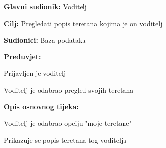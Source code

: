 					\noindent {}
					\begin{packed_item}
	
						\item \textbf{Glavni sudionik: } Voditelj
						\item  \textbf{Cilj:} Pregledati popis teretana kojima je on voditelj
						\item  \textbf{Sudionici:} Baza podataka
						\item  \textbf{Preduvjet:}
						\item[] \begin{packed_enum}
	
							\item Prijavljen je voditelj
							\item Voditelj je odabrao pregled svojih teretana

						\end{packed_enum}
						\item  \textbf{Opis osnovnog tijeka:}
						
						\item[] \begin{packed_enum}
	
							\item Voditelj  je odabrao opciju "moje teretane"
							\item Prikazuje se popis teretana tog voditelja
						\end{packed_enum}
						

					\end{packed_item}
					
